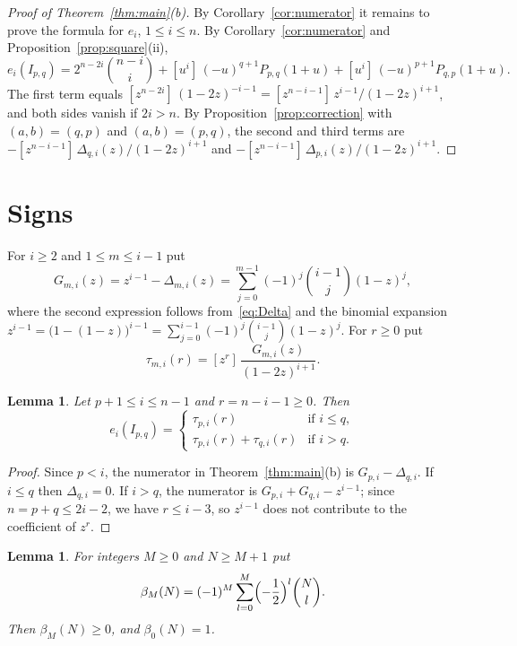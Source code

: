 \documentclass{amsart}
\newtheorem{lemma}[theorem]{Lemma}
\theoremstyle{definition}
\theoremstyle{remark}
\numberwithin{equation}{section}
\newcommand{\cf}[1]{[#1]\,}
\begin{document}
\begin{proof}[Proof of Theorem~\ref{thm:main}\textup{(b)}]
By Corollary~\ref{cor:numerator} it remains to prove the formula for $e_i$,
$1\le i\le n$. By Corollary~\ref{cor:numerator} and
Proposition~\ref{prop:square}(ii),
\[
  e_i(I_{p,q})=2^{n-2i}\binom{n-i}{i}
  +\cf{u^i}(-u)^{q+1}P_{p,q}(1+u)+\cf{u^i}(-u)^{p+1}P_{q,p}(1+u).
\]
The first term equals
$\cf{z^{n-2i}}(1-2z)^{-i-1}=\cf{z^{n-i-1}}z^{i-1}/(1-2z)^{i+1}$, and both sides
vanish if $2i>n$. By Proposition~\ref{prop:correction} with $(a,b)=(q,p)$ and
$(a,b)=(p,q)$, the second and third terms are
$-\cf{z^{n-i-1}}\Delta_{q,i}(z)/(1-2z)^{i+1}$ and
$-\cf{z^{n-i-1}}\Delta_{p,i}(z)/(1-2z)^{i+1}$.
\end{proof}

\section{Signs}\label{sec:signs}

For $i\ge2$ and $1\le m\le i-1$ put
\[
  G_{m,i}(z)=z^{i-1}-\Delta_{m,i}(z)=\sum_{j=0}^{m-1}(-1)^j\binom{i-1}{j}(1-z)^j,
\]
where the second expression follows from~\eqref{eq:Delta} and the binomial
expansion $z^{i-1}=\bigl(1-(1-z)\bigr)^{i-1}=\sum_{j=0}^{i-1}(-1)^j\binom{i-1}{j}(1-z)^j$.
For $r\ge0$ put
\[
  \tau_{m,i}(r)=\cf{z^r}\frac{G_{m,i}(z)}{(1-2z)^{i+1}}.
\]

\begin{lemma}\label{lem:reduction}
Let $p+1\le i\le n-1$ and $r=n-i-1\ge0$. Then
\[
  e_i(I_{p,q})=
  \begin{cases}
    \tau_{p,i}(r) & \text{if } i\le q,\\
    \tau_{p,i}(r)+\tau_{q,i}(r) & \text{if } i>q.
  \end{cases}
\]
\end{lemma}

\begin{proof}
Since $p<i$, the numerator in Theorem~\ref{thm:main}(b) is
$G_{p,i}-\Delta_{q,i}$. If $i\le q$ then $\Delta_{q,i}=0$. If $i>q$, the
numerator is $G_{p,i}+G_{q,i}-z^{i-1}$; since $n=p+q\le2i-2$, we have
$r\le i-3$, so $z^{i-1}$ does not contribute to the coefficient of $z^r$.
\end{proof}

\begin{lemma}\label{lem:partial}
For integers $M\ge0$ and $N\ge M+1$ put
\[
  \beta_M(N)=(-1)^M\sum_{l=0}^{M}\Bigl(-\frac12\Bigr)^l\binom{N}{l}.
\]
Then $\beta_M(N)\ge0$, and $\beta_0(N)=1$.
\end{lemma}
\end{document}
